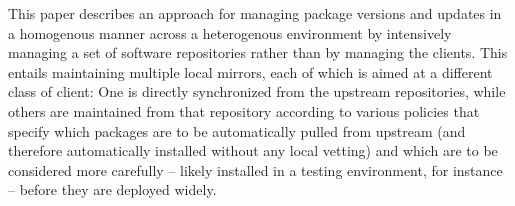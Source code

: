 This paper describes an approach for managing package versions and
updates in a homogenous manner across a heterogenous environment by
intensively managing a set of software repositories rather than by
managing the clients.  This entails maintaining multiple local
mirrors, each of which is aimed at a different class of client: One is
directly synchronized from the upstream repositories, while others are
maintained from that repository according to various policies that
specify which packages are to be automatically pulled from upstream
(and therefore automatically installed without any local vetting) and
which are to be considered more carefully -- likely installed in a
testing environment, for instance -- before they are deployed widely.
